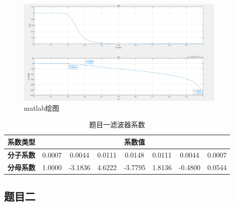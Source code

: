 \documentclass[12pt,hyperref,a4paper,UTF8]{ctexart}
\begin{document}
\begin{figure}[H] %
        \centering
        \includegraphics[width=0.9\textwidth]{figures/301.png} %
        \caption{matlab绘图} %
        \label{fig:example} %
\end{figure}

\begin{table}[H]
\centering
\caption{题目一滤波器系数}
\label{tab:filter_coef}
\begin{tabular}{|c|c|c|c|c|c|c|c|}
\hline
\textbf{系数类型} & \multicolumn{7}{c|}{\textbf{系数值}} \\
\hline
\textbf{分子系数} & 0.0007 & 0.0044 & 0.0111 & 0.0148 & 0.0111 & 0.0044 & 0.0007 \\
\hline
\textbf{分母系数} & 1.0000 & -3.1836 & 4.6222 & -3.7795 & 1.8136 & -0.4800 & 0.0544 \\
\hline
\end{tabular}
\end{table}

\subsection{题目二}
\end{document}
